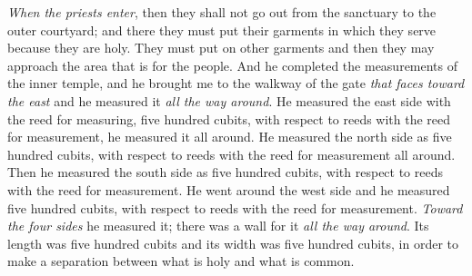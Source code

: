 \begin{biblechapter}
\verse \textit{When the priests enter}, then they shall not go out from the sanctuary to the outer courtyard; and there they must put their garments in which they serve because they are holy. They must put on other garments and then they may approach the area that is for the people.
\verse And he completed the measurements of the inner temple, and he brought me to the walkway of the gate \textit{that faces toward the east} and he measured it \textit{all the way around}.
\verse He measured the east side with the reed for measuring, five hundred cubits, with respect to reeds with the reed for measurement, he measured it all around.
\verse He measured the north side as five hundred cubits, with respect to reeds with the reed for measurement all around.
\verse Then he measured the south side as five hundred cubits, with respect to reeds with the reed for measurement.
\verse He went around the west side and he measured five hundred cubits, with respect to reeds with the reed for measurement.
\verse \textit{Toward the four sides} he measured it; there was a wall for it \textit{all the way around}. Its length was five hundred cubits and its width was five hundred cubits, in order to make a separation between what is holy and what is common.
\end{biblechapter}

